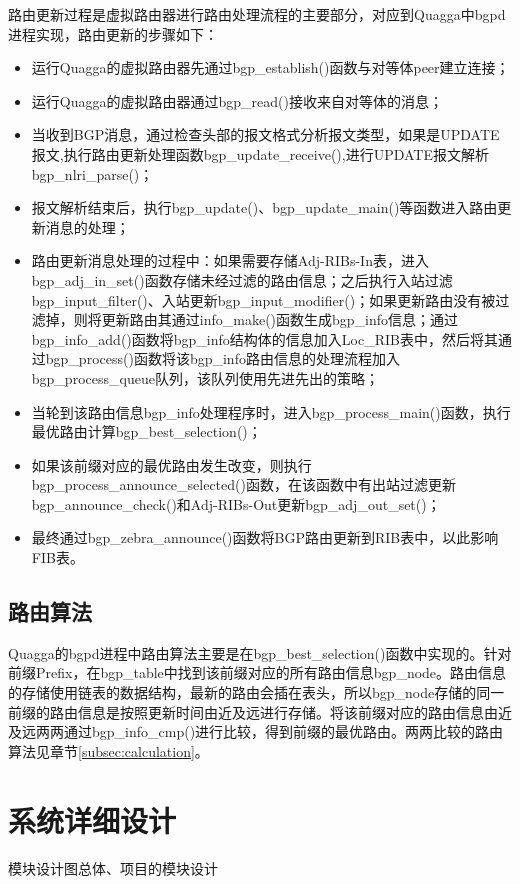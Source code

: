 路由更新过程是虚拟路由器进行路由处理流程的主要部分，对应到Quagga中bgpd进程实现，路由更新的步骤如下：
\begin{itemize}
  \item 运行Quagga的虚拟路由器先通过bgp\_establish()函数与对等体peer建立连接；
  \item 运行Quagga的虚拟路由器通过bgp\_read()接收来自对等体的消息；
  \item 当收到BGP消息，通过检查头部的报文格式分析报文类型，如果是UPDATE报文,执行路由更新处理函数bgp\_update\_receive(),进行UPDATE报文解析bgp\_nlri\_parse()；
  \item 报文解析结束后，执行bgp\_update()、bgp\_update\_main()等函数进入路由更新消息的处理；
  \item 路由更新消息处理的过程中：如果需要存储Adj-RIBs-In表，进入bgp\_adj\_in\_set()函数存储未经过滤的路由信息；之后执行入站过滤bgp\_input\_filter()、入站更新bgp\_input\_modifier()；如果更新路由没有被过滤掉，则将更新路由其通过info\_make()函数生成bgp\_info信息；通过bgp\_info\_add()函数将bgp\_info结构体的信息加入Loc\_RIB表中，然后将其通过bgp\_process()函数将该bgp\_info路由信息的处理流程加入bgp\_process\_queue队列，该队列使用先进先出的策略；
  \item 当轮到该路由信息bgp\_info处理程序时，进入bgp\_process\_main()函数，执行最优路由计算bgp\_best\_selection()；
  \item 如果该前缀对应的最优路由发生改变，则执行bgp\_process\_announce\_selected()函数，在该函数中有出站过滤更新bgp\_announce\_check()和Adj-RIBs-Out更新bgp\_adj\_out\_set()；
  \item 最终通过bgp\_zebra\_announce()函数将BGP路由更新到RIB表中，以此影响FIB表。
\end{itemize}

\subsection{路由算法}

Quagga的bgpd进程中路由算法主要是在bgp\_best\_selection()函数中实现的。针对前缀Prefix，在bgp\_table中找到该前缀对应的所有路由信息bgp\_node。路由信息的存储使用链表的数据结构，最新的路由会插在表头，所以bgp\_node存储的同一前缀的路由信息是按照更新时间由近及远进行存储。将该前缀对应的路由信息由近及远两两通过bgp\_info\_cmp()进行比较，得到前缀的最优路由。两两比较的路由算法见章节\ref{subsec:calculation}。


\section{系统详细设计}
模块设计图总体、项目的模块设计

